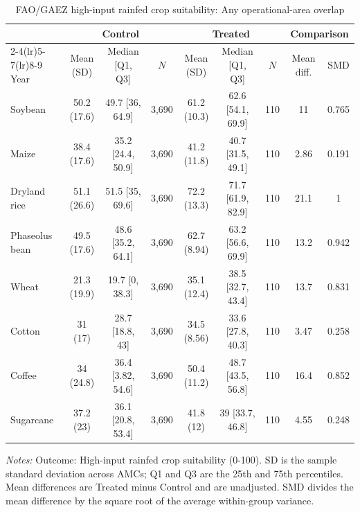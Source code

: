 \begin{table}[!htbp]
\centering
\caption{FAO/GAEZ high-input rainfed crop suitability: Any operational-area overlap}
\label{tab:polocentro_operational_any_overlap_gaez_high_input}
\small
\setlength{\tabcolsep}{4pt}
\begin{tabular}{@{}lcccccccc@{}}
\toprule
& \multicolumn{3}{c}{Control} & \multicolumn{3}{c}{Treated} & \multicolumn{2}{c}{Comparison} \\
\cmidrule(lr){2-4}\cmidrule(lr){5-7}\cmidrule(lr){8-9}
Year & Mean (SD) & Median [Q1, Q3] & $N$ & Mean (SD) & Median [Q1, Q3] & $N$ & Mean diff. & SMD \\
\midrule
Soybean & 50.2 (17.6) & 49.7 [36, 64.9] & 3,690 & 61.2 (10.3) & 62.6 [54.1, 69.9] & 110 & 11 & 0.765 \\
Maize & 38.4 (17.6) & 35.2 [24.4, 50.9] & 3,690 & 41.2 (11.8) & 40.7 [31.5, 49.1] & 110 & 2.86 & 0.191 \\
Dryland rice & 51.1 (26.6) & 51.5 [35, 69.6] & 3,690 & 72.2 (13.3) & 71.7 [61.9, 82.9] & 110 & 21.1 & 1 \\
Phaseolus bean & 49.5 (17.6) & 48.6 [35.2, 64.1] & 3,690 & 62.7 (8.94) & 63.2 [56.6, 69.9] & 110 & 13.2 & 0.942 \\
Wheat & 21.3 (19.9) & 19.7 [0, 38.3] & 3,690 & 35.1 (12.4) & 38.5 [32.7, 43.4] & 110 & 13.7 & 0.831 \\
Cotton & 31 (17) & 28.7 [18.8, 43] & 3,690 & 34.5 (8.56) & 33.6 [27.8, 40.3] & 110 & 3.47 & 0.258 \\
Coffee & 34 (24.8) & 36.4 [3.82, 54.6] & 3,690 & 50.4 (11.2) & 48.7 [43.5, 56.8] & 110 & 16.4 & 0.852 \\
Sugarcane & 37.2 (23) & 36.1 [20.8, 53.4] & 3,690 & 41.8 (12) & 39 [33.7, 46.8] & 110 & 4.55 & 0.248 \\
\bottomrule
\end{tabular}
\vspace{2pt}
\begin{minipage}{0.98\linewidth}
\footnotesize \textit{Notes:} Outcome: High-input rainfed crop suitability (0-100). SD is the sample standard deviation across AMCs; Q1 and Q3 are the 25th and 75th percentiles. Mean differences are Treated minus Control and are unadjusted. SMD divides the mean difference by the square root of the average within-group variance.
\end{minipage}
\end{table}